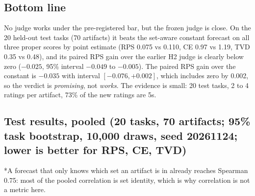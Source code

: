 
\subsection*{Bottom line}
No judge works under the pre-registered bar, but the frozen judge is close. On the 20 held-out test tasks (70 artifacts) it beats
the set-aware constant forecast on all three proper scores by point estimate (RPS 0.075 vs 0.110, CE 0.97 vs 1.19, TVD 0.35 vs 0.48),
and its paired RPS gain over the earlier H2 judge is clearly below zero ($-0.025$, 95\% interval $-0.049$ to $-0.005$). The paired RPS gain
over the constant is $-0.035$ with interval $[-0.076, +0.002]$, which includes zero by 0.002, so the verdict is \emph{promising}, not \emph{works}.
The evidence is small: 20 test tasks, 2 to 4 ratings per artifact, 73\% of the new ratings are 5s.

\subsection*{Test results, pooled (20 tasks, 70 artifacts; 95\% task bootstrap, 10,000 draws, seed 20261124; lower is better for RPS, CE, TVD)}
\begin{center}\scriptsize\setlength{\tabcolsep}{3pt}
\end{center}
*A forecast that only knows which set an artifact is in already reaches Spearman 0.75: most of the pooled correlation is set identity, which is why correlation is not a metric here.

